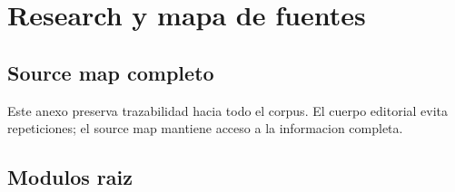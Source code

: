 \chapter{Research y mapa de fuentes}


\section{Source map completo}


Este anexo preserva trazabilidad hacia todo el corpus. El cuerpo editorial evita repeticiones; el source map mantiene acceso a la informacion completa.


\section{Modulos raiz}


